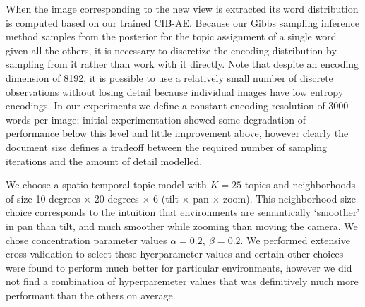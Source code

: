 When the image corresponding to the new view is extracted its word distribution is computed based on our trained CIB-AE. Because our Gibbs sampling inference method samples from the posterior for the topic assignment of a single word given all the others, it is necessary to discretize the encoding distribution by sampling from it rather than work with it directly. Note that despite an encoding dimension of 8192, it is possible to use a relatively small number of discrete observations without losing detail because individual images have low entropy encodings. In our experiments we define a constant encoding resolution of 3000 words per image; initial experimentation showed some degradation of performance below this level and little improvement above, however clearly the document size defines a tradeoff between the required number of sampling iterations and the amount of detail modelled.

We choose a spatio-temporal topic model with $K = 25$ topics and neighborhoods of size 10 degrees $\times$ 20 degrees $\times$ 6 (tilt $\times$ pan $\times$ zoom). This neighborhood size choice corresponds to the intuition that environments are semantically `smoother' in pan than tilt, and much smoother while zooming than moving the camera. We chose concentration parameter values $\alpha = 0.2,~\beta = 0.2$. We performed extensive cross validation to select these hyerparameter values and certain other choices were found to perform much better for particular environments, however we did not find a combination of hyperparemeter values that was definitively much more performant than the others on average.

